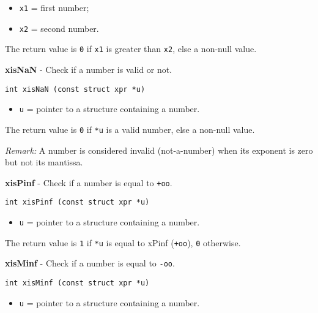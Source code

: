 \documentclass{article}
\begin{document}
\begin{itemize}
\item \texttt{x1} = first number;
\item \texttt{x2} = second number.
\end{itemize}

The return value is \texttt{0} if \texttt{x1} is greater than \texttt{x2},
else a non-null value.


\hrulefill{}

\textbf{xisNaN} - Check if a number is valid or not.

\begin{verbatim}
int xisNaN (const struct xpr *u)
\end{verbatim}

\begin{itemize}
\item \texttt{u} = pointer to a structure containing a number.
\end{itemize}

The return value is \texttt{0} if \texttt{*u} is a valid number,
else a non-null value. 

\textit{Remark:}
A number is considered invalid (not-a-number) when its
exponent is zero but not its mantissa.


\hrulefill{}

\textbf{xisPinf} - Check if a number is equal to \texttt{+oo}.

\begin{verbatim}
int xisPinf (const struct xpr *u)
\end{verbatim}

\begin{itemize}
\item \texttt{u} = pointer to a structure containing a number.
\end{itemize}

The return value is \texttt{1} if \texttt{*u} is equal to
xPinf (\texttt{+oo}), \texttt{0} otherwise.


\hrulefill{}

\textbf{xisMinf} - Check if a number is equal to \texttt{-oo}.

\begin{verbatim}
int xisMinf (const struct xpr *u)
\end{verbatim}

\begin{itemize}
\item \texttt{u} = pointer to a structure containing a number.
\end{itemize}
\end{document}
